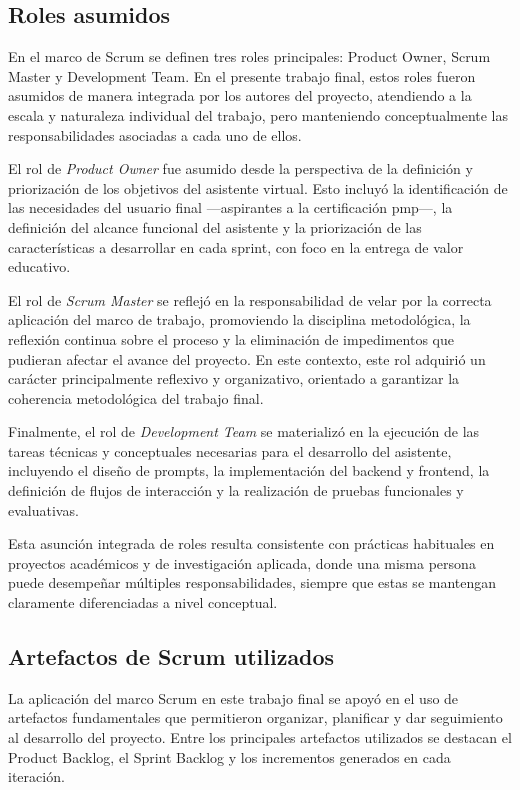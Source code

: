 \subsection{Roles asumidos}

En el marco de Scrum se definen tres roles principales: Product Owner, Scrum Master y Development Team. En el presente trabajo final, estos roles fueron asumidos de manera integrada por los autores del proyecto, atendiendo a la escala y naturaleza individual del trabajo, pero manteniendo conceptualmente las responsabilidades asociadas a cada uno de ellos.

El rol de \textit{Product Owner} fue asumido desde la perspectiva de la definición y priorización de los objetivos del asistente virtual. Esto incluyó la identificación de las necesidades del usuario final —aspirantes a la certificación \gls{pmp}—, la definición del alcance funcional del asistente y la priorización de las características a desarrollar en cada sprint, con foco en la entrega de valor educativo.

El rol de \textit{Scrum Master} se reflejó en la responsabilidad de velar por la correcta aplicación del marco de trabajo, promoviendo la disciplina metodológica, la reflexión continua sobre el proceso y la eliminación de impedimentos que pudieran afectar el avance del proyecto. En este contexto, este rol adquirió un carácter principalmente reflexivo y organizativo, orientado a garantizar la coherencia metodológica del trabajo final.

Finalmente, el rol de \textit{Development Team} se materializó en la ejecución de las tareas técnicas y conceptuales necesarias para el desarrollo del asistente, incluyendo el diseño de prompts, la implementación del backend y frontend, la definición de flujos de interacción y la realización de pruebas funcionales y evaluativas.

Esta asunción integrada de roles resulta consistente con prácticas habituales en proyectos académicos y de investigación aplicada, donde una misma persona puede desempeñar múltiples responsabilidades, siempre que estas se mantengan claramente diferenciadas a nivel conceptual.

\subsection{Artefactos de Scrum utilizados}

La aplicación del marco Scrum en este trabajo final se apoyó en el uso de artefactos fundamentales que permitieron organizar, planificar y dar seguimiento al desarrollo del proyecto. Entre los principales artefactos utilizados se destacan el Product Backlog, el Sprint Backlog y los incrementos generados en cada iteración.

